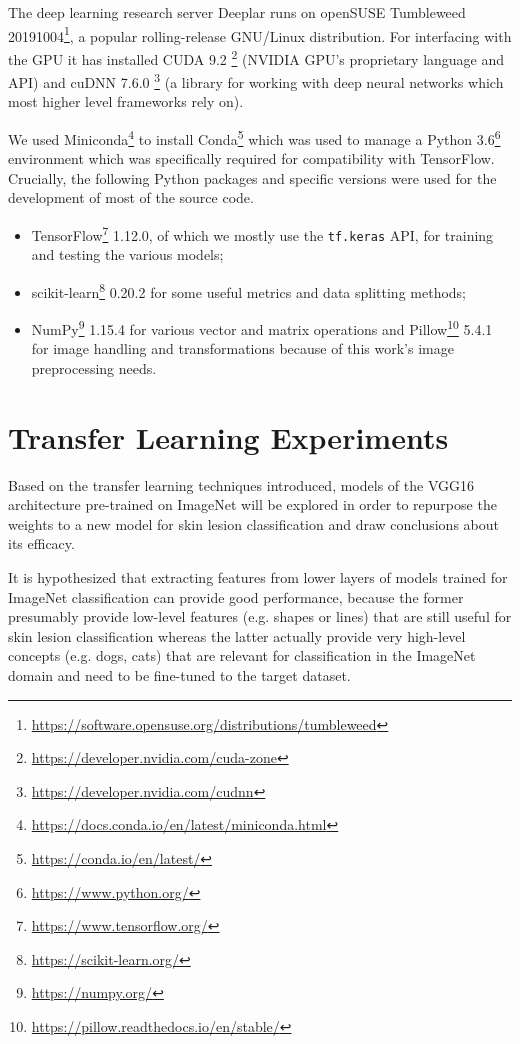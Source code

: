 The deep learning research server Deeplar runs on openSUSE Tumbleweed 20191004\footnote{\url{https://software.opensuse.org/distributions/tumbleweed}}, a popular rolling-release GNU/Linux distribution. For interfacing with the \ac{GPU} it has installed CUDA 9.2 \footnote{\url{https://developer.nvidia.com/cuda-zone}} (NVIDIA GPU's proprietary language and API) and cuDNN 7.6.0 \footnote{\url{https://developer.nvidia.com/cudnn}} (a library for working with deep neural networks which most higher level frameworks rely on).

We used Miniconda\footnote{\url{https://docs.conda.io/en/latest/miniconda.html}} to install Conda\footnote{\url{https://conda.io/en/latest/}} which was used to manage a Python 3.6\footnote{\url{https://www.python.org/}} environment which was specifically required for compatibility with TensorFlow. Crucially, the following Python packages and specific versions were used for the development of most of the source code.

\begin{itemize}
    \item TensorFlow\footnote{\url{https://www.tensorflow.org/}} 1.12.0, of which we mostly use the \verb|tf.keras| API, for training and testing the various models;
    \item scikit-learn\footnote{\url{https://scikit-learn.org/}} 0.20.2 for some useful metrics and data splitting methods;
    \item NumPy\footnote{\url{https://numpy.org/}} 1.15.4 for various vector and matrix operations and Pillow\footnote{\url{https://pillow.readthedocs.io/en/stable/}} 5.4.1 for image handling and transformations because of this work's image preprocessing needs.
\end{itemize}

\section{Transfer Learning Experiments}

Based on the transfer learning techniques introduced, models of the VGG16 architecture pre-trained on ImageNet will be explored in order to repurpose the weights to a new model for skin lesion classification and draw conclusions about its efficacy.

It is hypothesized that extracting features from lower layers of models trained for ImageNet classification can provide good performance, because the former presumably provide low-level features (e.g. shapes or lines) that are still useful for skin lesion classification whereas the latter actually provide very high-level concepts (e.g. dogs, cats) that are relevant for classification in the ImageNet domain and need to be fine-tuned to the target dataset.

